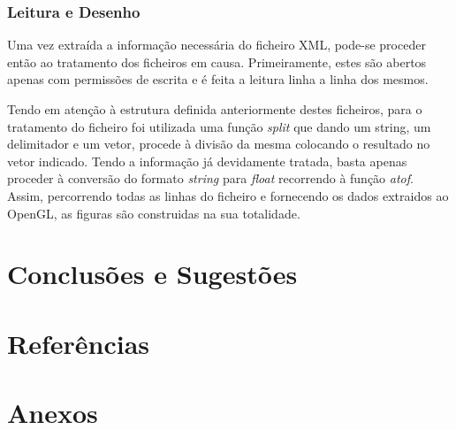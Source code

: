 \documentclass[a4paper]{article}
\begin{document}
\subsubsection{Leitura e Desenho}

\hspace{3mm} Uma vez extraída a informação necessária do ficheiro XML, pode-se proceder então ao tratamento dos ficheiros em causa. Primeiramente, estes são abertos apenas com permissões de escrita e é feita a leitura linha a linha dos mesmos.
\par Tendo em atenção à estrutura definida anteriormente destes ficheiros, para o tratamento do ficheiro foi utilizada uma função \emph{split} que dando um string, um delimitador e um vetor, procede à divisão da mesma colocando o resultado no vetor indicado.
Tendo a informação já devidamente tratada, basta apenas proceder à conversão do formato \emph{string} para \emph{float} recorrendo à função \emph{atof}. Assim, percorrendo todas as linhas do ficheiro e fornecendo os dados extraidos ao OpenGL, as figuras são construidas na sua totalidade.

\section{Conclusões e Sugestões}


\section{Referências}


\section{Anexos}
\end{document}
